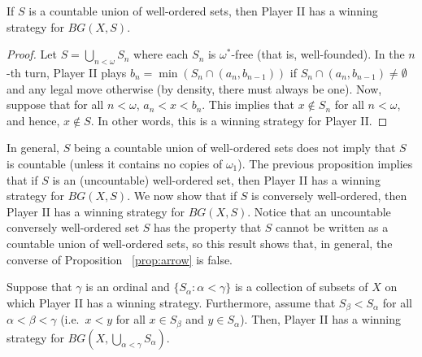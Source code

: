 \begin{proposition}\label{prop:arrow}
    If $S$ is a countable union of well-ordered sets, then Player II has a winning strategy for $BG(X,S)$.
\end{proposition}

\begin{proof}
    Let $S=\bigcup_{n<\omega}S_n$ where each $S_n$ is $\omega^*$-free (that is, well-founded).
    In the $n$-th turn, Player II plays $b_n=\min(S_n\cap(a_n,b_{n-1}))$ if $S_n\cap(a_n,b_{n-1})\neq\emptyset$ and any legal move otherwise (by density, there must always be one).
    Now, suppose that for all $n<\omega$, $a_n<x<b_n$.
    This implies that $x\notin S_n$ for all $n<\omega$, and hence, $x\notin S$.
    In other words, this is a winning strategy for Player II.
\end{proof}

In general, $S$ being a countable union of well-ordered sets does not imply that $S$ is countable (unless it contains no copies of $\omega_1$).
The previous proposition implies that if $S$ is an (uncountable) well-ordered set, then Player II has a winning strategy for $BG(X,S)$.
We now show that if $S$ is conversely well-ordered, then Player II has a winning strategy for $BG(X,S)$.
Notice that an uncountable conversely well-ordered set $S$ has the property that $S$ cannot be written as a countable union of well-ordered sets, so this result shows that, in general, the converse of Proposition ~\ref{prop:arrow} is false.

\begin{theorem}\label{thm:blocks}
    Suppose that $\gamma$ is an ordinal and $\{S_\alpha:\alpha<\gamma\}$ is a collection of subsets of $X$ on which Player II has a winning strategy.
    Furthermore, assume that $S_\beta<S_\alpha$ for all $\alpha<\beta<\gamma$ (i.e.\, $x<y$ for all $x\in S_\beta$ and $y\in S_\alpha$).
    Then, Player II has a winning strategy for $BG\left(X,\bigcup_{\alpha<\gamma}S_\alpha\right)$.
\end{theorem}

